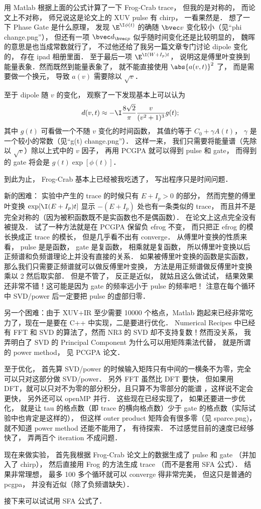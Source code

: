 用 Matlab 根据上面的公式计算了一下 Frog-Crab trace， 但我的是对称的， 而论文上不对称， 师兄说这是论文上的 XUV pulse 有 chirp， 一看果然是． 想了一下 Phase Gate 是什么原理， 发现 $\E^{\I\phi(t)}$ 的确随 $\bvec v$ 变化较小（见“phi change.png”）， 但还有一项 $\bvec d_{\bvec p}$ 似乎随时间变化还是比较明显的， 魏晖的意思是也当成常数就行了， 不过他还给了我另一篇文章专门讨论 dipole 变化的， 存在 ipad 相册里面． 至于最后一项 $\E^{\I(W+I_p)t}$， 说明这是傅里叶变换到能量表象．然而既然到能量表象了， 就不能直接使用 $\abs{a(v, t)}^2$ 了， 而是需要做一个换元， 导致 $a(v)$ 需要除以 $\sqrt{v}$．

至于 dipole 随 $v$ 的变化， 观察了一下发现基本上可以认为
\begin{equation}
d(v, t) \approx -\I \frac{8\sqrt2}{\pi} \frac{v}{(v^2+1)^3} g(t);
\end{equation}
其中 $g(t)$ 可看做一个不随 $v$ 变化的时间函数， 其值约等于 $C_0 + \gamma A(t)$， $\gamma$ 是一个较小的常数（见“g(t) change.png”）． 这样一来， 我们只需要将能量谱（先除以 $\sqrt{v}$）除以上式中的 $v$ 因子， 再用 PCGPA 就可以得到 pulse 和 gate， 而得到的 gate 将会是 $g(t)\exp[\phi(t)]$．

到此为止， Frog-Crab 基本上已经被我吃透了， 写出程序只是时间问题．

新的困难： 实验中产生的 trace 的时候只有 $E + I_p > 0$ 的部分， 然而完整的傅里叶变换  $\exp[\I (E + I_p) t]$ 显示 $-(E + I_p)$ 处也有一条类似的 trace， 而且并不是完全对称的（因为被积函数既不是实函数也不是偶函数）． 在论文上这点完全没有被提及． 试了一种方法就是在 PCGPA 保留负 efrog 不变， 而只把正 efrog 的模长换成正 trace 的模长， 但是几乎看不出有 converge． 从傅里叶变换的性质来看， pulse 是是函数， gate 是复函数， 相乘就是复函数， 所以傅里叶变换以后正频谱和负频谱理论上并没有直接的关系． 如果被傅里叶变换的函数是实函数， 那么我们只需要正频谱就可以做反傅里叶变换， 方法是用正频谱做反傅里叶变换乘以 2 然后取实部． 但是不管了， 反正是近似， 就姑且这么做试试， 结果效果还非常不错！这可能是因为 gate 的频率远小于 pulse 的频率吧！ 注意在每个循环中 SVD/power 后一定要把 pulse 的虚部归零．

另一个困难：由于 XUV+IR 至少需要 10000 个格点，Matlab 跑起来已经非常吃力了，现在一是要在 C++ 中实现，二是要进行优化． Numerical Recipes 中已经有 FFT 和 SVD 的算法了，然而 NR3 的 SVD 却不支持复数！然而没关系， 我弄明白了 SVD 的 Principal Component 为什么可以用矩阵乘法代替， 就是所谓的 power method， 见 PCGPA 论文．

至于优化， 首先算 SVD/power 的时候输入矩阵只有中间的一横条不为零，完全可以只对这部分做 SVD/power． 另外 FFT 虽然比 DFT 要快， 但如果用 DFT，就可以只对不为零的部分积分，且只算不为零部分的能谱 ，这样说不定会更快， 另外还可以 openMP 并行． 这些现在已经实现了， 如果还要进一步优化， 就是让 tau 的格点数（即 trace 的横向格点数）少于 gate 的格点数（实际试验中也肯定是这样的）， 但这样 outer product 矩阵会有很多零（见 sparce.png)， 就不知道 power method 还能不能用了， 有待探索． 不过感觉目前的速度已经够快了， 弄两百个 iteration 不成问题．

现在来做实验， 首先我根据 Frog-Crab 论文上的数据生成了 pulse 和 gate （并加入了 chirp）， 然后直接用 Frog 的方法生成 trace （而不是套用 SFA 公式）． 结果非常理想， 最多 100 多个循环就可以 converge 得非常完美， 但这只是普通的 pcgpa， 并没有近似（除了负频谱缺失）．

接下来可以试试用 SFA 公式了．









